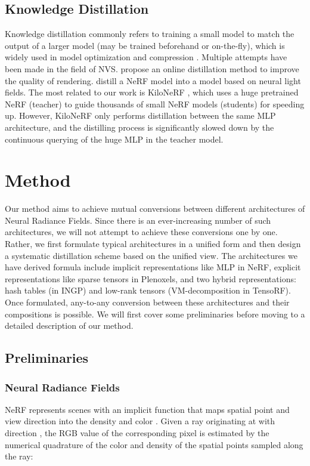\documentclass[letterpaper]{article} \usepackage{aaai23}  \usepackage{times}  \usepackage{helvet}  \usepackage{courier}  \usepackage[hyphens]{url}  \usepackage{graphicx} \urlstyle{rm} \def\UrlFont{\rm}  \usepackage{natbib}  \usepackage{caption} \frenchspacing  \setlength{\pdfpagewidth}{8.5in}  \setlength{\pdfpageheight}{11in}  \usepackage{multirow}
\begin{document}
\subsection{Knowledge Distillation}
Knowledge distillation commonly refers to training a small model to match the output of a larger model (may be trained beforehand or on-the-fly), which is widely used in model optimization and compression \cite{hinton2015distilling, gou2021knowledge}. Multiple attempts have been made in the field of NVS. \citeauthor{barron2022mip} propose an online distillation method to improve the quality of rendering. \citeauthor{wang2022r2l} distill a NeRF model into a model based on neural light fields. The most related to our work is KiloNeRF \cite{reiser2021kiloNeRF}, which uses a huge pretrained NeRF (teacher) to guide thousands of small NeRF models (students) for speeding up. However, KiloNeRF only performs distillation between the same MLP architecture, and the distilling process is significantly slowed down by the continuous querying of the huge MLP in the teacher model.


\section{Method}
\label{sec:method}
Our method aims to achieve mutual conversions between different architectures of Neural Radiance Fields. Since there is an ever-increasing number of such architectures, we will not attempt to achieve these conversions one by one. Rather, we first formulate typical architectures in a unified form and then design a systematic distillation scheme based on the unified view. The architectures we have derived formula include implicit representations like MLP in NeRF, explicit representations like sparse tensors in Plenoxels, and two hybrid representations: hash tables (in INGP) and low-rank tensors (VM-decomposition in TensoRF). Once formulated, any-to-any conversion between these architectures and their compositions is possible. We will first cover some preliminaries before moving to a detailed description of our method. 


\subsection{Preliminaries}
\subsubsection{Neural Radiance Fields}
NeRF represents scenes with an implicit function that maps spatial point  and view direction  into the density  and color . Given a ray  originating at  with direction , the RGB value  of the corresponding pixel is estimated by the numerical quadrature of the color  and density  of the spatial points  sampled along the ray:
\end{document}
